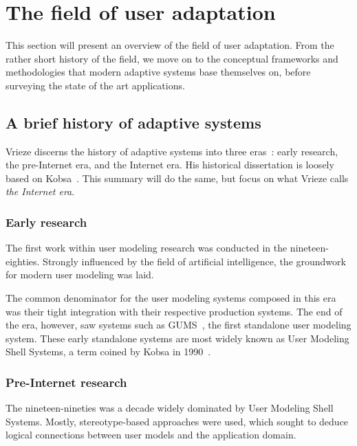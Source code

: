 \section{The field of user adaptation}
\label{survey:sec:user_adaptation}

This section will present an overview of the field of user adaptation. From the rather short history of the field, we move on to the conceptual frameworks and methodologies that modern adaptive systems base themselves on, before surveying the state of the art applications.

\subsection{A brief history of adaptive systems}
\label{survey:sec:adaptive_systems_history}

Vrieze discerns the history of adaptive systems into three eras~\cite{Vrieze}: early research, the pre-Internet era, and the Internet era. His historical dissertation is loosely based on Kobsa~\cite{Kobsa2001}. This summary will do the same, but focus on what Vrieze calls \emph{the Internet era}.

\subsubsection{Early research}

The first work within user modeling research was conducted in the nineteen-eighties. Strongly influenced by the field of artificial intelligence, the groundwork for modern user modeling was laid.

The common denominator for the user modeling systems composed in this era was their tight integration with their respective production systems. The end of the era, however, saw systems such as GUMS~\cite{Finin1989}, the first standalone user modeling system. These early standalone systems are most widely known as User Modeling Shell Systems, a term coined by Kobsa in 1990~\cite{Kobsa1990}.

\subsubsection{Pre-Internet research}

The nineteen-nineties was a decade widely dominated by User Modeling Shell Systems. Mostly, stereotype-based approaches were used, which sought to deduce logical connections between user models and the application domain.

